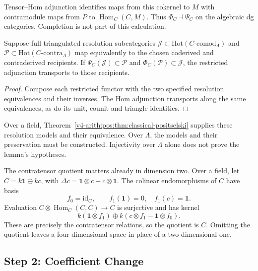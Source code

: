 Tensor--Hom adjunction identifies maps from this cokernel to
\(M\) with contramodule maps from \(P\) to
\(\operatorname{Hom}_C(C,M)\). Thus \(\Phi_C\dashv\Psi_C\)
on the algebraic dg categories. Completion is not part of
this calculation.

\begin{lemma}
\label{v4-arith:pos:lem:well-defined}
Suppose full triangulated resolution subcategories
\(\mathcal J\subset\mathrm{Hot}(C\text{-comod}_\Lambda)\)
and \(\mathcal P\subset\mathrm{Hot}(C\text{-contra}_\Lambda)\)
map equivalently to the chosen coderived and contraderived
recipients. If \(\Psi_C(\mathcal J)\subset\mathcal P\) and
\(\Phi_C(\mathcal P)\subset\mathcal J\), the restricted
adjunction transports to those recipients.
\end{lemma}
\begin{proof}
Compose each restricted functor with the two specified
resolution equivalences and their inverses.
The Hom adjunction transports along the same equivalences,
as do its unit, counit and triangle identities.
\end{proof}

Over a field, Theorem~\ref{v4-arith:pos:thm:classical-positselski}
supplies these resolution models and their equivalence.
Over \(\Lambda\), the models and their preservation must be
constructed. Injectivity over \(\Lambda\) alone does not prove
the lemma's hypotheses.

The contratensor quotient matters already in dimension two.
Over a field, let \(C=k\mathbf1\oplus kc\), with
\(\Delta c=\mathbf1\otimes c+c\otimes\mathbf1\).
The colinear endomorphisms of \(C\) have basis
\[
 f_0=\mathrm{id}_C,
 \qquad f_1(\mathbf1)=0,\quad f_1(c)=\mathbf1.
\]
Evaluation \(C\otimes\operatorname{Hom}_C(C,C)\to C\)
is surjective and has kernel
\[
 k(\mathbf1\otimes f_1)
 \oplus k(c\otimes f_1-\mathbf1\otimes f_0).
\]
These are precisely the contratensor relations, so the
quotient is \(C\). Omitting the quotient leaves a
four-dimensional space in place of a two-dimensional one.

\subsection{Step 2: Coefficient Change}
\label{v4-arith:pos:step-2}

